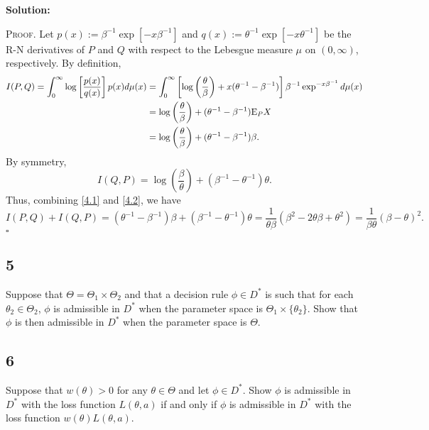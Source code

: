 \documentclass[12pt]{article}
\newcounter{ProofCounter}
\newenvironment{Proof}{\stepcounter{ProofCounter}\textsc{Proof.}}{\hfill$\square$}
\begin{document}
\textbf{Solution:}

\begin{Proof}
  Let $p(x) := \beta^{-1}\exp\left[ -x\beta^{-1} \right]$ and $q(x) := \theta^{-1}\exp\left[ -x\theta^{-1} \right]$ be the R-N derivatives of $P$ and
  $Q$ with respect to the Lebesgue measure $\mu$ on $(0,\infty)$, respectively. By definition,
  \begin{align}
    I(P,Q) = \int_{0}^{\infty}\log\left[ \frac{p(x)}{q(x)} \right]p(x)d\mu(x) & = \int_{0}^{\infty}\left[ \log\left( \frac{\theta}{\beta}\right) + 
    x(\theta^{-1} - \beta^{-1}) \right]\beta^{-1}\exp^{-x\beta^{-1}}d\mu(x) \nonumber \\
    & = \log\left( \frac{\theta}{\beta} \right) + (\theta^{-1} - \beta^{-1})\mathrm{E}_{P}X \nonumber \\
    & = \log\left( \frac{\theta}{\beta} \right) + (\theta^{-1} - \beta^{-1})\beta. \label{4.1}
  \end{align}
  By symmetry,
  \begin{equation}
    I(Q,P) = \log\left( \frac{\beta}{\theta} \right) + (\beta^{-1} - \theta^{-1})\theta.
    \label{4.2}
  \end{equation}
  Thus, combining \eqref{4.1} and \eqref{4.2}, we have 
  \[ 
    I(P,Q) + I(Q,P) = (\theta^{-1} - \beta^{-1})\beta + (\beta^{-1} - \theta^{-1})\theta = \frac{1}{\theta\beta}(\beta^{2} - 2\theta\beta +
    \theta^{2}) = \frac{1}{\beta\theta}(\beta - \theta)^{2}.
  \]
\end{Proof}


\newpage
\subsection*{5}
\begin{tcolorbox}
  Suppose that $\Theta = \Theta_1 \times \Theta_2$ and that a decision rule $\phi \in D^*$ is such that for each $\theta_2\in\Theta_2$, $\phi$
  is admissible in $D^*$ when the parameter space is $\Theta_1\times \{\theta_2\}$.  Show that $\phi$ is then admissible in $D^*$ when the parameter space is $\Theta$.
\end{tcolorbox}


\newpage
\subsection*{6}
\begin{tcolorbox}
  Suppose that $w(\theta)>0$ for any $\theta \in \Theta$ and let $\phi \in D^*$.  Show $\phi$ is admissible in $D^*$ with the loss function $L(\theta,a)$
  if and only if $\phi$ is admissible in $D^*$ with the loss function $w(\theta)L(\theta,a)$.
\end{tcolorbox}
\end{document}
